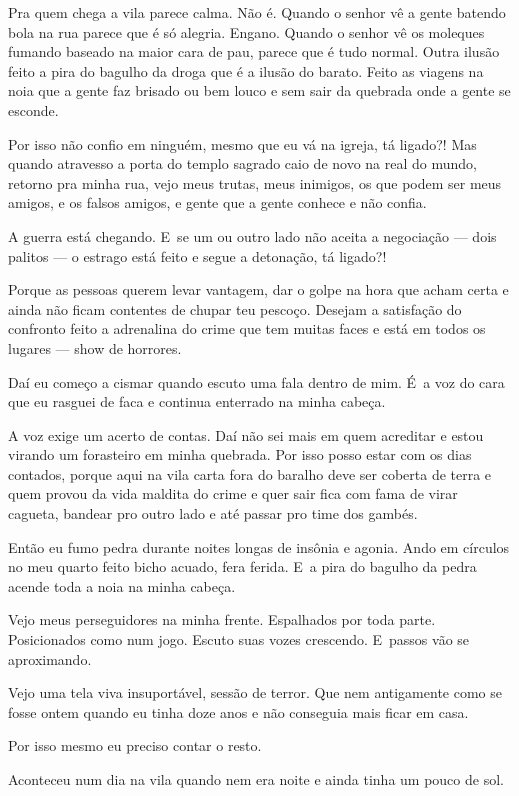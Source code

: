 Pra quem chega a vila parece calma. Não é. Quando o senhor vê a gente
batendo bola na rua parece que é só alegria. Engano. Quando o senhor vê
os moleques fumando baseado na maior cara de pau, parece que é tudo
normal. Outra ilusão feito a pira do bagulho da droga que é a ilusão do
barato. Feito as viagens na noia que a gente faz brisado ou bem louco e
sem sair da quebrada onde a gente se esconde.

Por isso não confio em ninguém, mesmo que eu vá na igreja, tá ligado?!
Mas quando atravesso a porta do templo sagrado caio de novo na real do
mundo, retorno pra minha rua, vejo meus trutas, meus inimigos, os que
podem ser meus amigos, e os falsos amigos, e gente que a gente conhece e
não confia.

A guerra está chegando. E~se um ou outro lado não aceita a negociação
--- dois palitos --- o estrago está feito e segue a detonação, tá
ligado?!

Porque as pessoas querem levar vantagem, dar o golpe na hora que acham
certa e ainda não ficam contentes de chupar teu pescoço. Desejam a
satisfação do confronto feito a adrenalina do crime que tem muitas faces
e está em todos os lugares --- show de horrores.

Daí eu começo a cismar quando escuto uma fala dentro de mim. É~a voz do
cara que eu rasguei de faca e continua enterrado na minha cabeça.

A voz exige um acerto de contas. Daí não sei mais em quem acreditar e
estou virando um forasteiro em minha quebrada. Por isso posso estar com
os dias contados, porque aqui na vila carta fora do baralho deve ser
coberta de terra e quem provou da vida maldita do crime e quer sair fica
com fama de virar cagueta, bandear pro outro lado e até passar pro time
dos gambés.

Então eu fumo pedra durante noites longas de insônia e agonia. Ando em
círculos no meu quarto feito bicho acuado, fera ferida. E~a pira do
bagulho da pedra acende toda a noia na minha cabeça.

Vejo meus perseguidores na minha frente. Espalhados por toda parte.
Posicionados como num jogo. Escuto suas vozes crescendo. E~passos vão se
aproximando.

Vejo uma tela viva insuportável, sessão de terror. Que nem antigamente
como se fosse ontem quando eu tinha doze anos e não conseguia mais ficar
em casa.

Por isso mesmo eu preciso contar o resto.

Aconteceu num dia na vila quando nem era noite e ainda tinha um pouco de
sol.

